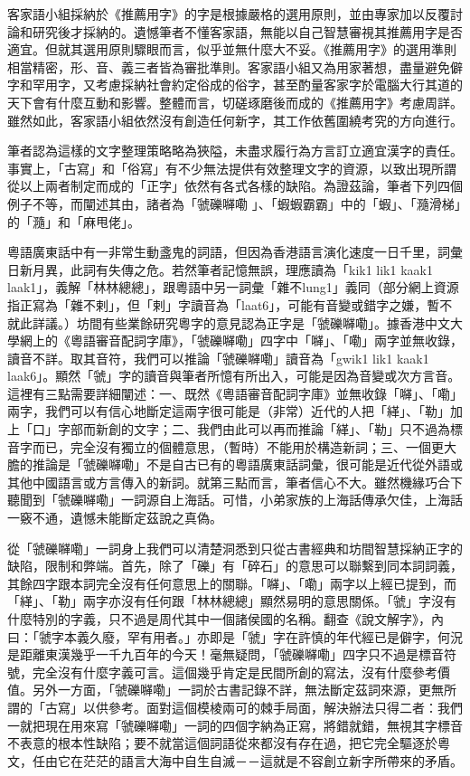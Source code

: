 \documentclass[a5paper, 10pt, openany]{book} %
\begin{document}
客家語小組採納於《推薦用字》的字是根據嚴格的選用原則，並由專家加以反覆討論和研究後才採納的。遺憾筆者不懂客家語，無能以自己智慧審視其推薦用字是否適宜。但就其選用原則驟眼而言，似乎並無什麼大不妥。《推薦用字》的選用準則相當精密，形、音、義三者皆為審批準則。客家語小組又為用家著想，盡量避免僻字和罕用字，又考慮採納社會約定俗成的俗字，甚至酌量客家字於電腦大行其道的天下會有什麼互動和影響。整體而言，切磋琢磨後而成的《推薦用字》考慮周詳。 雖然如此，客家語小組依然沒有創造任何新字，其工作依舊圍繞考究的方向進行。

筆者認為這樣的文字整理策略略為狹隘，未盡求履行為方言訂立適宜漢字的責任。事實上，「古寫」和「俗寫」有不少無法提供有效整理文字的資源，以致出現所謂從以上兩者制定而成的「正字」依然有各式各樣的缺陷。為證茲論，筆者下列四個例子不等，而闡述其由，諸者為「虢礫𡃈嘞 」、「蝦蝦霸霸」中的「蝦」、「瀡滑梯」的「瀡」和「麻甩佬」。

粵語廣東話中有一非常生動盞鬼的詞語，但因為香港語言演化速度一日千里，詞彙日新月異，此詞有失傳之危。若然筆者記憶無誤，理應讀為「kik1 lik1 kaak1 laak1」，義解「林林總總」，跟粵語中另一詞彙「雜不lung1」義同（部分網上資源指正寫為「雜不剌」，但「剌」字讀音為「laat6」，可能有音變或錯字之嫌，暫不就此詳議。）坊間有些業餘研究粵字的意見認為正字是「虢礫𡃈嘞」。據香港中文大學網上的《粵語審音配詞字庫》，「虢礫𡃈嘞」四字中「𡃈」、「嘞」兩字並無收錄，讀音不詳。取其音符，我們可以推論「虢礫𡃈嘞」讀音為「gwik1 lik1 kaak1 laak6」。顯然「虢」字的讀音與筆者所憶有所出入，可能是因為音變或次方言音。這裡有三點需要詳細闡述：一、既然《粵語審音配詞字庫》並無收錄「𡃈」、「嘞」兩字，我們可以有信心地斷定這兩字很可能是（非常）近代的人把「緙」、「勒」加上「口」字部而新創的文字；二、我們由此可以再而推論「緙」、「勒」只不過為標音字而已，完全沒有獨立的個體意思，（暫時）不能用於構造新詞；三、一個更大膽的推論是「虢礫𡃈嘞」不是自古已有的粵語廣東話詞彙，很可能是近代從外語或其他中國語言或方言傳入的新詞。就第三點而言，筆者信心不大。雖然機緣巧合下聽聞到「虢礫𡃈嘞」一詞源自上海話。可惜，小弟家族的上海話傳承欠佳，上海話一竅不通，遺憾未能斷定茲說之真偽。

從「虢礫𡃈嘞」一詞身上我們可以清楚洞悉到只從古書經典和坊間智慧採納正字的缺陷，限制和弊端。首先，除了「礫」有「碎石」的意思可以聯繫到同本詞詞義，其餘四字跟本詞完全沒有任何意思上的關聯。「𡃈」、「嘞」兩字以上經已提到，而「緙」、「勒」兩字亦沒有任何跟「林林總總」顯然易明的意思關係。「虢」字沒有什麼特別的字義，只不過是周代其中一個諸侯國的名稱。翻查《說文解字》，內曰：「虢字本義久廢，罕有用者。」亦即是「虢」字在許慎的年代經已是僻字，何況是距離東漢幾乎一千九百年的今天！毫無疑問，「虢礫𡃈嘞」四字只不過是標音符號，完全沒有什麼字義可言。這個幾乎肯定是民間所創的寫法，沒有什麼參考價值。另外一方面，「虢礫𡃈嘞」一詞於古書記錄不詳，無法斷定茲詞來源，更無所謂的「古寫」以供參考。面對這個模棱兩可的棘手局面，解決辦法只得二者：我們一就把現在用來寫「虢礫𡃈嘞」一詞的四個字納為正寫，將錯就錯，無視其字標音不表意的根本性缺陷；要不就當這個詞語從來都沒有存在過，把它完全驅逐於粵文，任由它在茫茫的語言大海中自生自滅－－這就是不容創立新字所帶來的矛盾。
\end{document}
